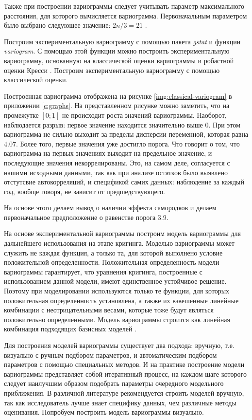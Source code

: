 Также при построении вариограммы следует учитывать параметр максимального расстояния, для которого вычисляется вариограмма. Первоначальным параметром было выбрано следующее значение: $ 2n / 3 = 21 $ \cite{cressie2011statistics}.

Построим экспериментальную вариограмму с помощью пакета \textit{gstat} и функции \textit{variogram}. С помощью этой функции можно построить экспериментальную вариограмму, основанную на классической оценки вариограммы и робастной оценки Кресси \cite{cressie2011statistics}. Построим экспериментальную вариограмму с помощью классической оценки.

Построенная вариограмма отображена на рисунке \ref{img:classical-variogram} в приложении \ref{c:graphs}. На представленном рисунке можно заметить, что на промежутке $[0;1]$ не происходит роста значений вариограммы. Наоборот, наблюдается разрыв: первое значение находится значительно выше $0$. При этом вариограмма не сильно выходит за пределы дисперсии переменной, которая равна $4.07$. Более того, первые значения уже достигло порога. Что говорит о том, что вариограмма на первых значениях выходит на предельное значение, и последующие значения некоррелированы. Это, на самом деле, согласуется с нашими исходными данными, так как при анализе остатков было выявлено отстутсвие автокорреляций, и спецификой самих данных: наблюдение за каждый год, вообще говоря, не зависит от предшедствующего.

На основе этого делаем вывод о наличии эффекта самородков и делаем первоначальное предположение о равенстве порога $3.9$.

На основе экспериментальной вариограммы построим модель вариограммы для дальнейшего использования на этапе кригинга. Моделью вариограммы может служить не каждая функция, а только та, для которой выполнено условие положительной определенности. Положительная определенность модели вариограммы гарантирует, что уравнения кригинга, построенные с использованием данной модели, имеют единственное устойчивое решение. Поэтому при моделировании используются только те функции, для которых положительная определенность установлена, а также их взвешенные линейные комбинации с неотрицательными весами, которые тоже будут являться положительно определенными. Модель вариограммы строится как линейная комбинация подходящих базисных моделей \cite{saveliev2012}.

Для построения моделей вариограммы существует два подхода: вручную, т.е. визуально с ручным подбором параметров, и автоматическим подбором параметров с помощью специальных методов. И на практике построение модели вариограммы представляет собой итеративный процесс, на каждом шаге которого следует наилучшим образом подобрать параметры очередного модельного приближения. В различной литературе рекомендуется строить моделей вручную, так как исследователь лучше знает специфику данных, чем различные методы оценивания. Попробуем построить модель вариограммы визуально.

